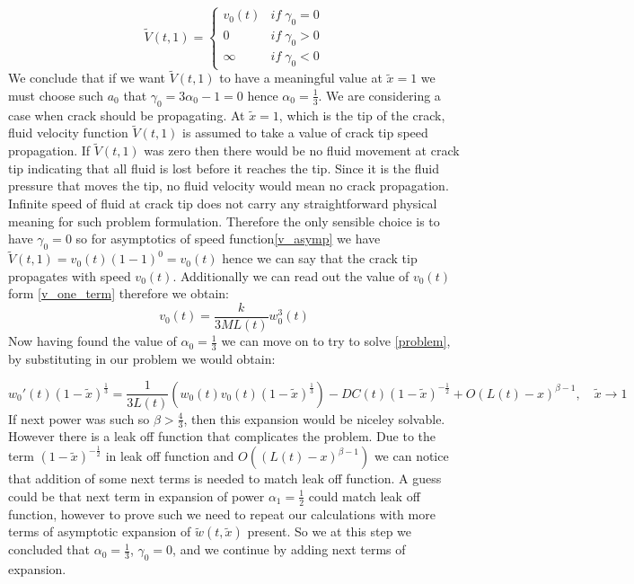 \begin{equation}
\tilde{V}(t,1)=\begin{cases}
v_{0}(t) & if\;\gamma_{0}=0\\
0 & if\;\gamma_{0}>0\\
\infty & if\;\gamma_{0}<0
\end{cases}\label{eq:-25}
\end{equation}
We conclude that if we want $\tilde{V}(t,1)$ to have
a meaningful value at $\tilde{x}=1$ we must choose such $a_{0}$
that $\gamma_{0}=3\alpha_{0}-1=0$ hence $\alpha_{0}=\frac{1}{3}$.
We are considering a case when crack should be propagating. At $\tilde{x}=1$, which is the tip of the crack, fluid velocity function $\tilde{V}(t,1)$ is assumed to take a value of crack tip speed propagation. If
$\tilde{V}(t,1)$ was zero then there would be no fluid movement at
crack tip indicating that all fluid is lost before it reaches the
tip. Since it is the fluid pressure that moves the tip, no fluid velocity would mean no crack propagation. Infinite speed of fluid at crack tip does not carry any straightforward physical meaning for such problem formulation. Therefore the only sensible choice is to have $\gamma_{0}=0$ so for asymptotics of speed function\eqref{v_asymp} we have $\tilde{V}(t,1)=v_{0}(t)(1-1)^{0}=v_{0}(t)$ hence we can say that the crack tip propagates with speed $v_{0}(t)$. Additionally we can read out the value of $v_{0}(t)$ form \ref{v_one_term} therefore we obtain: 
\begin{equation}
v_{0}(t)=\frac{k}{3ML(t)}w_{0}^{3}(t)\label{v_0}
\end{equation}
Now having found the value of $\alpha_{0}=\frac{1}{3}$ we can move
on to try to solve \eqref{problem}, by substituting in our problem we would obtain:

\begin{equation}
w_{0}'(t)(1-\tilde{x})^{\frac{1}{3}}=\frac{1}{3L(t)}\left(w_{0}(t)v_{0}(t)(1-\tilde{x})^{\frac{1}{3}}\right)-DC(t)(1-\tilde{x})^{-\frac{1}{2}}+O\left(L(t)-x\right)^{\beta-1},\quad\tilde{x}\to1\label{eq:-10}
\end{equation}
If next power was such so $\beta>\frac{4}{3}$, then this expansion
would be niceley solvable. However there is a leak off function that complicates the problem. Due to the term $(1-\tilde{x})^{-\frac{1}{2}}$ in leak off function and $O\left(\left(L(t)-x\right)^{\beta-1}\right)$ we can notice that addition of some next terms is needed to match leak off function. A guess could be that next term in expansion of power $\alpha_{1}=\frac{1}{2}$ could match leak off function, however to prove such we need to repeat our calculations with more terms of asymptotic expansion of $\tilde{w}(t,\tilde{x})$ present. So we at this step we concluded that $\alpha_{0}=\frac{1}{3}$, $\gamma_{0}=0$, and we continue by adding next terms of expansion.

